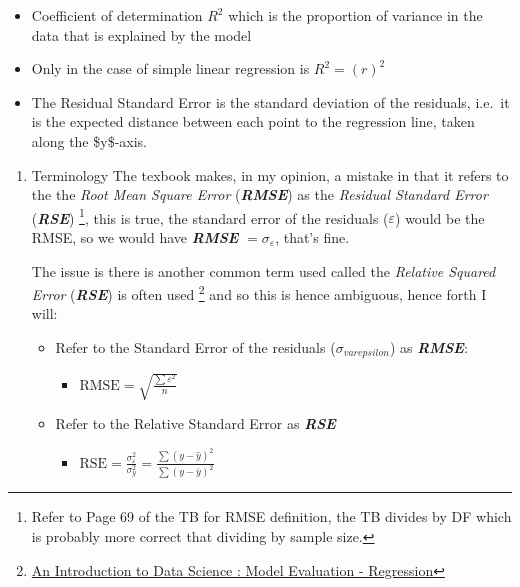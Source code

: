 \documentclass[11pt]{article}
\begin{document}
\begin{enumerate}
\begin{itemize}
\item Coefficient of determination \(R^2\) which is the proportion of variance
in the data that is explained by the model
\item Only in the case of simple linear regression is \(R^2 = (r)^2\)
\item The Residual Standard Error is the standard deviation of the
residuals, i.e. it is the expected distance between each point to the
regression line, taken along the \$y\$-axis.
\end{itemize}
\begin{enumerate}
\item Terminology
\label{sec:org971a574}
The texbook makes, in my opinion, a mistake in that it refers to the the
\emph{Root Mean Square Error} (\textbf{\emph{RMSE}}) as the \emph{Residual Standard Error}
(\textbf{\emph{RSE}}) \footnote{Refer to Page 69 of the TB for RMSE definition, the TB divides
by DF which is probably more correct that dividing by sample
size.}, this is true, the standard error of the residuals
(\(\varepsilon\)) would be the RMSE, so we would have \textbf{\emph{RMSE}}
\(= \sigma_{\varepsilon}\), that's fine.

The issue is there is another common term used called the \emph{Relative
Squared Error} (\textbf{\emph{RSE}}) is often used \footnote{\href{https://www.saedsayad.com/model\_evaluation\_r.htm}{An
Introduction to Data Science : Model Evaluation - Regression}} and so this is hence
ambiguous, hence forth I will:

\begin{itemize}
\item Refer to the Standard Error of the residuals (\(\sigma_{varepsilon}\))
as \textbf{\emph{RMSE}}:

\begin{itemize}
\item \(\text{RMSE} = \sqrt{\frac{\sum{\varepsilon ^2}}{n}}\)
\end{itemize}

\item Refer to the Relative Standard Error as \textbf{\emph{RSE}}

\begin{itemize}
\item \(\text{RSE} = \frac{\sigma_{\varepsilon} ^2}{\sigma_y ^2} = \frac{\sum{\left( y-\hat{y} \right)^2 }}{ \sum{ \left( y-\bar{y} \right)^2 } }\)


\end{itemize}
\end{itemize}
\end{enumerate}
\end{enumerate}
\end{document}
